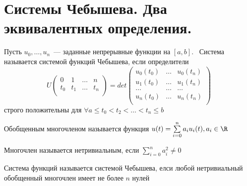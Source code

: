  \section{Системы Чебышева. Два эквивалентных определения.}

 \begin{dfn}
Пусть $u_0, …, u_n$ — заданные непрерывные функции на $[a,b]$.  Система называется системой функций Чебышева, если 
определители
$$U\left(
\begin{array}{cccc}
0 & 1 & … & n \\
t_0 & t_1 & … & t_n\\
\end{array}  \right) = det \left(
\begin{array}{ccc}
u_0(t_0) & … & u_0(t_n) \\
u_1(t_0) & … & u_1(t_n) \\
… & … & … \\
u_n(t_0) & … & u_n(t_n) \\
\end{array}
 \right)
 $$
 строго положительны для $\forall a \leq t_0 < t_2 < … < t_n \leq b$
 \end{dfn}
 \begin{dfn}
Обобщенным многочленом называется функция $u(t) = \sum \limits_{i=0}^n a_iu_i(t), a_i \in \R$
 \end{dfn}

\begin{dfn}
Многочлен называется нетривиальным, если $\sum \limits_{i=0}^n a_i^2 \neq 0$
\end{dfn}

\begin{dfn}
Система функций называется системой Чебышева, елси любой нетривиальный обобщенный многочлен имеет не более $n$ нулей
\end{dfn}



\begin{thm}
\label{chebDefEqual}

\end{thm}